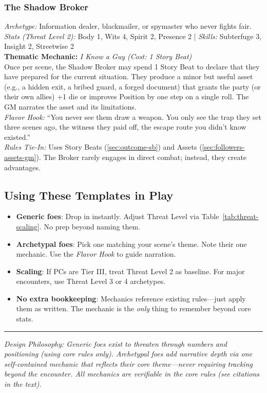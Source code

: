 \subsubsection{The Shadow Broker}
\textit{Archetype:} Information dealer, blackmailer, or spymaster who never fights fair.\\
\textit{Stats (Threat Level 2):} Body 1, Wits 4, Spirit 2, Presence 2 \quad | \quad \textit{Skills:} Subterfuge 3, Insight 2, Streetwise 2\\
\textbf{Thematic Mechanic:} \textit{I Know a Guy (Cost: 1 Story Beat)} \\
Once per scene, the Shadow Broker may spend 1 Story Beat to declare that they have prepared for the current situation. They produce a minor but useful asset (e.g., a hidden exit, a bribed guard, a forged document) that grants the party (or their own allies) +1 die or improves Position by one step on a single roll. The GM narrates the asset and its limitations.\\
\textit{Flavor Hook:} ``You never see them draw a weapon. You only see the trap they set three scenes ago, the witness they paid off, the escape route you didn't know existed.''\\
\textit{Rules Tie-In:} Uses Story Beats (\autoref{sec:outcome-sb}) and Assets (\autoref{sec:followers-assets-gm}). The Broker rarely engages in direct combat; instead, they create advantages.

\subsection{Using These Templates in Play}
\begin{itemize}
    \item \textbf{Generic foes}: Drop in instantly. Adjust Threat Level via Table~\ref{tab:threat-scaling}. No prep beyond naming them.
    \item \textbf{Archetypal foes}: Pick one matching your scene's theme. Note their one mechanic. Use the \textit{Flavor Hook} to guide narration.
    \item \textbf{Scaling}: If PCs are Tier III, treat Threat Level 2 as baseline. For major encounters, use Threat Level 3 or 4 archetypes.
    \item \textbf{No extra bookkeeping}: Mechanics reference existing rules---just apply them as written. The mechanic is the \textit{only} thing to remember beyond core stats.
\end{itemize}

\noindent
\rule{\linewidth}{0.5pt}
\small
\textit{Design Philosophy: Generic foes exist to threaten through numbers and positioning (using core rules only). Archetypal foes add narrative depth via one self-contained mechanic that reflects their core theme---never requiring tracking beyond the encounter. All mechanics are verifiable in the core rules (see citations in the text).}

